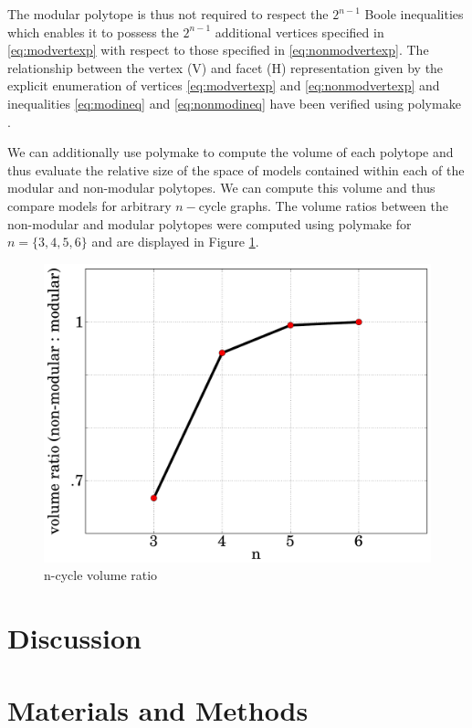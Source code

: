 The modular polytope is thus not required to respect the $2^{n-1}$ Boole inequalities which enables it to possess the $2^{n-1}$ additional vertices specified in \ref{eq:modvertexp} with respect to those specified in \ref{eq:nonmodvertexp}. The relationship between the vertex (V) and facet (H) representation given by the explicit enumeration of vertices \ref{eq:modvertexp} and \ref{eq:nonmodvertexp} and inequalities \ref{eq:modineq} and \ref{eq:nonmodineq} have been verified using polymake \cite{GawrilowEwgenijD-TJoswig2000}.

We can additionally use polymake to compute the volume of each polytope and thus evaluate the relative size of the space of models contained within each of the modular and non-modular polytopes. We can compute this volume and thus compare models for arbitrary $n-$cycle graphs. The volume ratios between the non-modular and modular polytopes were computed using polymake for $n=\{3,4,5,6\}$ and are displayed in Figure \ref{fig:ncycvolrat}.

\begin{figure}
\begin{center}
\noindent\includegraphics[width=0.6\columnwidth]{fig/ncycvolrat.pdf}
\end{center}
\caption{n-cycle volume ratio}
\label{fig:ncycvolrat}
\end{figure}


\section*{Discussion}

\section*{Materials and Methods}

